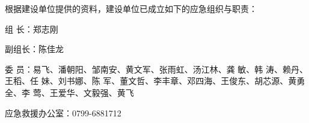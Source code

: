 根据建设单位提供的资料，建设单位已成立如下的应急组织与职责：

组 长：郑志刚

副组长：陈佳龙

委 员：易飞、潘朝阳、邹南安、黄文军、张雨虹、汤江林、龚 敏、韩 涛、赖丹、王稻、任 妹、刘书娜、陈 军、董文哲、李丰章、邓四海、王俊东、胡芯源、黄勇全、李 莺、王爱华、文毅强、黄飞

应急救援办公室：0799-6881712

